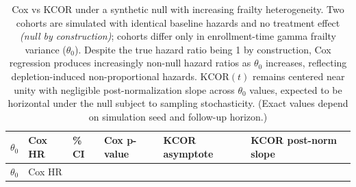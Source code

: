 \documentclass[
]{article}
\begin{document}
\begin{longtable}[]{@{}
  >{\raggedleft\arraybackslash}p{}
  >{\raggedleft\arraybackslash}p{}
  >{\raggedleft\arraybackslash}p{}
  >{\raggedleft\arraybackslash}p{}
  >{\raggedleft\arraybackslash}p{}
  >{\raggedleft\arraybackslash}p{}@{}}
\caption{Cox vs KCOR under a synthetic null with increasing frailty
heterogeneity. Two cohorts are simulated with identical baseline hazards
and no treatment effect \emph{(null by construction)}; cohorts differ
only in enrollment-time gamma frailty variance (\(\theta_0\)). Despite
the true hazard ratio being 1 by construction, Cox regression produces
increasingly non-null hazard ratios as \(\theta_0\) increases,
reflecting depletion-induced non-proportional hazards.
\(\mathrm{KCOR}(t)\) remains centered near unity with negligible
post-normalization slope across \(\theta_0\) values, expected to be
horizontal under the null subject to sampling stochasticity. (Exact
values depend on simulation seed and follow-up
horizon.)}\label{tbl:cox_bias_demo}\tabularnewline
\toprule\noalign{}
\begin{minipage}[b]{\linewidth}\raggedleft
\(\theta_0\)
\end{minipage} & \begin{minipage}[b]{\linewidth}\raggedleft
Cox HR
\end{minipage} & \begin{minipage}[b]{\linewidth}\raggedleft
95\% CI
\end{minipage} & \begin{minipage}[b]{\linewidth}\raggedleft
Cox p-value
\end{minipage} & \begin{minipage}[b]{\linewidth}\raggedleft
KCOR asymptote
\end{minipage} & \begin{minipage}[b]{\linewidth}\raggedleft
KCOR post-norm slope
\end{minipage} \\
\midrule\noalign{}
\endfirsthead
\toprule\noalign{}
\begin{minipage}[b]{\linewidth}\raggedleft
\(\theta_0\)
\end{minipage} & \begin{minipage}[b]{\linewidth}\raggedleft
Cox HR
\end{minipage} & \begin{minipage}[b]{\linewidth}\raggedleft

\end{minipage}
\end{longtable}
\end{document}
